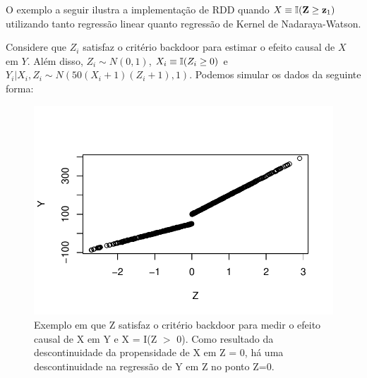 O exemplo a seguir ilustra a implementação de RDD quando
$X \equiv {\mathbb I}({\mathbf{Z}} \geq {\mathbf{z}}_1)$ utilizando 
tanto regressão linear quanto 
regressão de Kernel de Nadaraya-Watson.

\begin{example}
 \label{ex:rdd}
 Considere que $Z_i$ satisfaz 
 o critério backdoor para estimar 
 o efeito causal de $X$ em $Y$.
 Além disso, $Z_i \sim N(0,1)$,
 $X_i \equiv {\mathbb I}(Z_i \geq 0)$ e
 $Y_i|X_i,Z_i \sim N(50(X_i+1)(Z_i + 1), 1)$.
 Podemos simular os dados da seguinte forma:
 
\begin{knitrout}
\color{fgcolor}\begin{kframe}
\begin{alltt}
 \hlkwb{<-} 
 \hlkwb{<-} 
 \hlkwb{<-}  \hlopt{>=} 
 \hlkwb{<-}  \hlopt{*}\hlopt{+}\hlstd{)}\hlopt{*}\hlopt{+}\hlstd{))}
 \hlkwb{<-} 
\end{alltt}
\end{kframe}\begin{figure}[t]

{\centering \includegraphics[width=\maxwidth]{./figures/rdd_ex_1_1-1} 

}

\caption[Exemplo em que Z satisfaz o critério backdoor para medir o efeito causal de X em Y e X = I(Z $>$ 0)]{Exemplo em que Z satisfaz o critério backdoor para medir o efeito causal de X em Y e X = I(Z $>$ 0). Como resultado da descontinuidade da propensidade de X em Z = 0, há uma descontinuidade na regressão de Y em Z no ponto Z=0.}\label{fig:rdd_ex_1_1}
\end{figure}


\end{knitrout}
\end{example}
